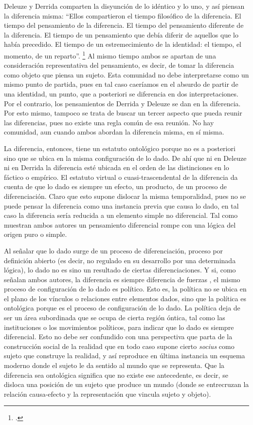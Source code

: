 Deleuze y Derrida comparten la disyunción de lo idéntico y lo uno, y así piensan la diferencia misma: \enquote{Ellos compartieron el tiempo filosófico de la diferencia. El tiempo del pensamiento de la diferencia. El tiempo del pensamiento diferente de la diferencia. El tiempo de un pensamiento que debía diferir de aquellos que lo había precedido. El tiempo de un estremecimiento de la identidad: el tiempo, el momento, de un reparto}. \footcite[250]{@6989-NANCY2008} Al mismo tiempo ambos se apartan de una consideración representativa del pensamiento, es decir, de tomar la diferencia como objeto que piensa un sujeto. Esta comunidad no debe interpretarse como un mismo punto de partida, pues en tal caso caeríamos en el absurdo de partir de una identidad, un punto, que a posteriori se diferencia en dos interpretaciones. Por el contrario, los pensamientos de Derrida y Deleuze se dan en la diferencia. Por esto mismo, tampoco se trata de buscar un tercer aspecto que pueda reunir las diferencias, pues no existe una regla común de esa reunión. No hay comunidad, aun cuando ambos abordan la diferencia misma, en sí misma.

La diferencia, entonces, tiene un estatuto ontológico porque no es a posteriori sino que se ubica en la misma configuración de lo dado. De ahí que ni en Deleuze ni en Derrida la diferencia esté ubicada en el orden de las distinciones en lo fáctico o empírico. El estatuto virtual o cuasi-trascendental de la diferencia da cuenta de que lo dado es siempre un efecto, un producto, de un proceso de diferenciación. Claro que esto supone dislocar la misma temporalidad, pues no se puede pensar la diferencia como una instancia previa que causa lo dado, en tal caso la diferencia sería reducida a un elemento simple no diferencial. Tal como muestran ambos autores un pensamiento diferencial rompe con una lógica del origen puro o simple.

Al señalar que lo dado surge de un proceso de diferenciación, proceso por definición abierto (es decir, no regulado en su desarrollo por una determinada lógica), lo dado no es sino un resultado de ciertas diferenciaciones. Y si, como señalan ambos autores, la diferencia es siempre diferencia de fuerzas , el mismo proceso de configuración de lo dado es político. Esto es, la política no se ubica en el plano de los vínculos o relaciones entre elementos dados, sino que la política es ontológica porque es el proceso de configuración de lo dado. La política deja de ser un área subordinada que se ocupa de cierta región óntica, tal como las instituciones o los movimientos políticos, para indicar que lo dado es siempre diferencial. Esto no debe ser confundido con una perspectiva que parta de la construcción social de la realidad que en todo caso supone cierto \emph{socius} como sujeto que construye la realidad, y así reproduce en última instancia un esquema moderno donde el sujeto le da sentido al mundo que se representa. Que la diferencia sea ontológica significa que no existe ese antecedente, es decir, se disloca una posición de un sujeto que produce un mundo (donde se entrecruzan la relación causa-efecto y la representación que vincula sujeto y objeto).

